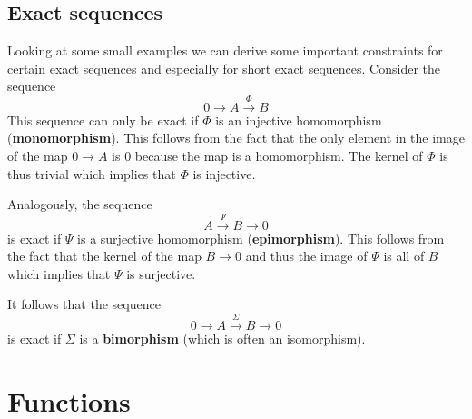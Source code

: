 \subsection{Exact sequences}

	
	
	\begin{property}
		Looking at some small examples we can derive some important constraints for certain exact sequences and especially for short exact sequences. Consider the sequence
		\[
			0\rightarrow A\xrightarrow{\Phi} B
		\]
		This sequence can only be exact if $\Phi$ is an injective homomorphism (\textbf{monomorphism}). This follows from the fact that the only element in the image of the map $0\rightarrow A$ is 0 because the map is a homomorphism. The kernel of $\Phi$ is thus trivial which implies that $\Phi$ is injective.
		
		Analogously, the sequence
		\[
			A\xrightarrow{\Psi}B\rightarrow0
		\]
		is exact if $\Psi$ is a surjective homomorphism (\textbf{epimorphism}). This follows from the fact that the kernel of the map $B\rightarrow0$ and thus the image of $\Psi$ is all of $B$ which implies that $\Psi$ is surjective.
		
		It follows that the sequence
		\[
			0\rightarrow A\xrightarrow{\Sigma}B\rightarrow0
		\]
		is exact if $\Sigma$ is a \textbf{bimorphism} (which is often an isomorphism).
	\end{property}

\section{Functions}
